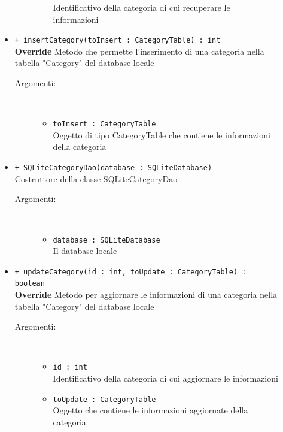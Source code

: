 \documentclass[../DefinizioneDiProdotto.tex]{subfiles}
\begin{document}
\begin{description}
\begin{itemize}
\begin{description}
\begin{itemize}
Identificativo della categoria di cui recuperare le informazioni\end{itemize}
\end{description}
\item \texttt{+ insertCategory(toInsert : CategoryTable) : int}\\
\textbf{Override} Metodo che permette l'inserimento di una categoria nella tabella "Category" del database locale
 \begin{description}
\item[Argomenti:] \
\begin{itemize}
\item \texttt{toInsert : CategoryTable}\\
Oggetto di tipo CategoryTable che contiene le informazioni della categoria\end{itemize}
\end{description}
\item \texttt{+ SQLiteCategoryDao(database : SQLiteDatabase)}\\
Costruttore della classe SQLiteCategoryDao
 \begin{description}
\item[Argomenti:] \
\begin{itemize}
\item \texttt{database : SQLiteDatabase}\\
Il database locale\end{itemize}
\end{description}
\item \texttt{+ updateCategory(id : int, toUpdate : CategoryTable) : boolean}\\
\textbf{Override} Metodo per aggiornare le informazioni di una categoria nella tabella "Category" del database locale
 \begin{description}
\item[Argomenti:] \
\begin{itemize}
\item \texttt{id : int}\\
Identificativo della categoria di cui aggiornare le informazioni\item \texttt{toUpdate : CategoryTable}\\
Oggetto che contiene le informazioni aggiornate della categoria\end{itemize}
\end{description}
\end{itemize}
\end{description}
\end{document}
